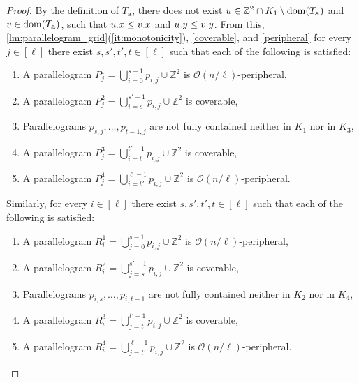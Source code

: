\documentclass[twoside,leqno]{article}
\let\Cref\cref
\newcommand{\Z}{\mathbb{Z}}
\renewcommand{\O}{\mathcal{O}}
\newcommand{\Ta}{T_\mathbf{a}}
\begin{document}
\begin{proof}
By the definition of $\Ta$, there does not exist $u \in \Z^2 \cap K_1 \setminus \d{\Ta}$ and $v \in \d{\Ta}$, such that $u.x \le v.x$ and $u.y \le v.y$. From this, \Cref{lm:parallelogram_grid}(\ref{it:monotonicity}), \cref{coverable}, and \cref{peripheral} for every $j \in [\ell]$ there exist $s,s', t',t \in [\ell]$  such that each of the following is satisfied:
\begin{enumerate}
	\item A parallelogram $P_j^1 = \bigcup_{i=0}^{s-1} p_{i, j} \cup \Z^2$ is $\O(n/\ell)$-peripheral,
	\item A parallelogram $P_j^2 = \bigcup_{i=s}^{s'-1} p_{i, j} \cup \Z^2$ is coverable, 
	\item Parallelograms $p_{s, j}, \dots, p_{t - 1, j}$ are not fully contained neither in $K_1$ nor in $K_3$,
	\item A parallelogram $P_j^3 = \bigcup_{i=t}^{t'-1} p_{i, j} \cup \Z^2$ is coverable,
	\item A parallelogram $P_j^4 = \bigcup_{i=t'}^{\ell - 1} p_{i, j} \cup \Z^2$ is $\O(n/\ell)$-peripheral.
\end{enumerate}

\noindent Similarly, for every $i \in [\ell]$ there exist $s,s', t',t \in [\ell]$  such that each of the following is satisfied:
\begin{enumerate}
	\item A parallelogram $R_i^1 = \bigcup_{j=0}^{s-1} p_{i, j} \cup \Z^2$ is $\O(n/\ell)$-peripheral,
	\item A parallelogram $R_i^2 = \bigcup_{j=s}^{s'-1} p_{i, j} \cup \Z^2$ is coverable, 
	\item Parallelograms $p_{i, s}, \dots, p_{i, t-1}$ are not fully contained neither in $K_2$ nor in $K_4$,
	\item A parallelogram $R_i^3 = \bigcup_{j=t}^{t'-1} p_{i, j} \cup \Z^2$ is coverable,
	\item A parallelogram $R_i^4 = \bigcup_{j=t'}^{\ell - 1} p_{i, j} \cup \Z^2$ is $\O(n/\ell)$-peripheral. 
\end{enumerate}


\end{proof}
\end{document}

